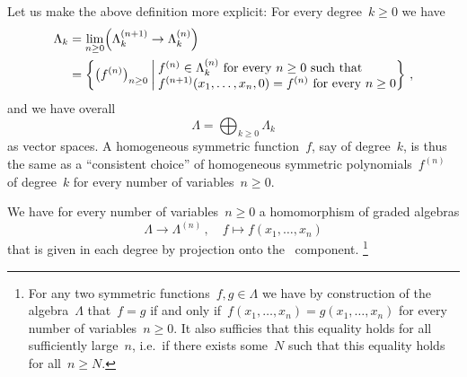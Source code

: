 \documentclass[a4paper, 11pt, twoside=semi]{scrartcl}
\begin{document}
Let us make the above definition more explicit:
For every degree~$k \geq 0$ we have
\begin{align*}
  \Lambda_k
  &=
  \lim_{n \geq 0}
  \Bigl( \Lambda^{(n+1)}_k \to \Lambda^{(n)}_k \Bigr)
  \\
  &=
  \left\{
    \bigl( f^{(n)} \bigr)_{n \geq 0}
    \suchthat*
    \begin{tabular}{@{}l@{}}
      $f^{(n)} \in \Lambda^{(n)}_k$ for every~$n \geq 0$ such that \\
      $f^{(n+1)}(x_1, \dotsc, x_n, 0) = f^{(n)}$ for every~$n \geq 0$
    \end{tabular}
  \right\} \,,
\end{align*}
and we have overall
\[
  \Lambda
  =
  \bigoplus_{k \geq 0} \Lambda_k
\]
as vector spaces.
A homogeneous symmetric function~$f$, say of degree~$k$, is thus the same as a \enquote{consistent choice} of homogeneous symmetric polynomials~$f^{(n)}$ of degree~$k$ for every number of variables~$n \geq 0$.

We have for every number of variables~$n \geq 0$ a homomorphism of graded algebras
\[
  \Lambda
  \to
  \Lambda^{(n)} \,,
  \quad
  f
  \mapsto
  f(x_1, \dotsc, x_n)
\]
that is given in each degree by projection onto the~ component.%
\footnote{%
  For any two symmetric functions~$f, g \in \Lambda$ we have by construction of the algebra~$\Lambda$ that~$f = g$ if and only if~$f(x_1, \dotsc, x_n) = g(x_1, \dotsc, x_n)$ for every number of variables~$n \geq 0$.
  It also sufficies that this equality holds for all sufficiently large~$n$, i.e.\ if there exists some~$N$ such that this equality holds for all~$n \geq N$.
}
\end{document}
